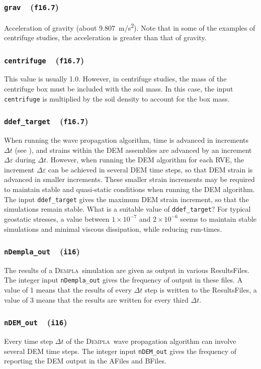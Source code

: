 \documentclass[letterpaper,11pt]{article}
\newcommand{\Dempla}{\textsc{Dempla}}
\newcommand{\Var}[2]{\texttt{#1}\ \  (\texttt{#2})}
\newcommand{\AFile}{\textsf{AFile}}
\newcommand{\BFile}{\textsf{BFile}}
\newcommand{\ResultsFile}{\textsf{ResultsFile}}
\begin{document}
\subsubsection[\texttt{grav}]{\Var{grav}{f16.7}}\label{sec:grav}
Acceleration of gravity (about 9.807~m/s\textsuperscript{2}).
Note that in some of the examples of centrifuge studies,
the acceleration is greater than that of gravity.
%
\subsubsection[\texttt{centrifuge}]{\Var{centrifuge}{f16.7}}\label{sec:centrifuge}
This value is usually 1.0.
However, in centrifuge studies, the mass of the centrifuge
box must be included with the soil mass.
In this case, the input \texttt{centrifuge} is multiplied
by the soil density to account for the box mass.
%
\subsubsection[\texttt{ddef\_target}]{\Var{ddef\_target}{f16.7}}\label{sec:ddeftarget}
When running the wave propagation algorithm,
time is advanced in increments $\Delta t$ (see \citep{Kuhn:2021a}),
and strains within the DEM assemblies are advanced
by an increment $\Delta \varepsilon$ during $\Delta t$.
However, when running the DEM algorithm for each RVE,
the increment $\Delta \varepsilon$ can be achieved in
several DEM time steps,
so that DEM strain is advanced in smaller increments.
These smaller strain increments may be required to maintain
stable and quasi-static conditions when running the DEM
algorithm.
The input \texttt{ddef\_target} gives the maximum DEM
strain increment, so that the simulations remain stable.
What is a suitable value of \texttt{ddef\_target}?
For typical geostatic stresses,
a value between $1\times 10^{-7}$ and $2\times 10^{-6}$
seems to maintain stable simulations
and minimal viscous dissipation,
while reducing run-times.
%
\subsubsection[\texttt{nDempla\_out}]{\Var{nDempla\_out}{i16}}\label{sec:nDemplaout}
The results of a \Dempla\ simulation are given as
output in various \ResultsFile s.
The integer input \texttt{nDempla\_out} gives the frequency
of output in these files.
A value of 1 means that the results of every $\Delta t$
step is written to the \ResultsFile s, a value of 3 means
that the results are written for every third $\Delta t$.
%
\subsubsection[\texttt{nDEM\_out}]{\Var{nDEM\_out}{i16}}\label{sec:nDEMout}
Every time step $\Delta t$ of the \Dempla\ wave propagation
algorithm can involve several DEM time steps.
The integer input \texttt{nDEM\_out} gives the frequency of
reporting the DEM output in the \AFile s and \BFile s.
%
\end{document}
